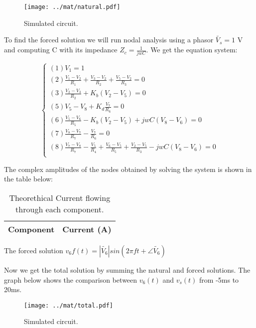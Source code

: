 \begin{figure}[H] \centering
\texttt{[image: ../mat/natural.pdf]}
\caption{Simulated circuit.}
\label{fig:sim_op}
\end{figure}


To find the forced solution we will run nodal analysis using a phasor $\widetilde{V_s}=1$ V and computing C with its impedance $Z_c=\frac{1}{jwC}$. We get the equation system:

\begin{equation}\label{eq:nodeForced}
  \begin{cases}
  (1) V_1 = 1 \\
  (2) \frac{V_1 - V_2}{R_1} + \frac{V_3 - V_2}{R_2} + \frac{V_5 - V_2}{R_3} = 0 \\
  (3) \frac{V_2 - V_3}{R_2} + K_b(V_2 - V_5) = 0 \\
  (5) V_5 - V_8 + K_d\frac{V_7}{R_6} = 0 \\
  (6) \frac{V_5 - V_6}{R_5} - K_b(V_2-V_5) + jwC(V_8-V_6)= 0 \\
  (7) \frac{V_8 - V_7}{R_7} - \frac{V_7}{R_6} = 0 \\
  (8) \frac{V_7 - V_8}{R_7} - \frac{V_5}{R_4} + \frac{V_6 - V_5}{R_5} + \frac{V_2 - V_5}{R_3} - jwC(V_8-V_6) = 0 \\
\end{cases}
\end{equation}

The complex amplitudes of the nodes obtained by solving the system is shown in the table below:

\begin{table}[H]
  \centering
  \begin{tabular}{|l|r|}
    \hline
        {\bf Component} & {\bf Current (A)} \\ \hline
        
  \end{tabular}
  \caption{Theorethical Current flowing through each component.}
  \label{tab:comp}
\end{table}
\par

The forced solution $v_6f(t)= |\widetilde{V_6}|sin(2\pi ft + \angle \widetilde{V_6})$

Now we get the total solution by summing the natural and forced solutions.
The graph below shows the comparison between $v_6(t)$ and $v_s(t)$ from -5ms to 20ms.

\begin{figure}[H] \centering
\texttt{[image: ../mat/total.pdf]}
\caption{Simulated circuit.}
\label{fig:sim_op}
\end{figure}


